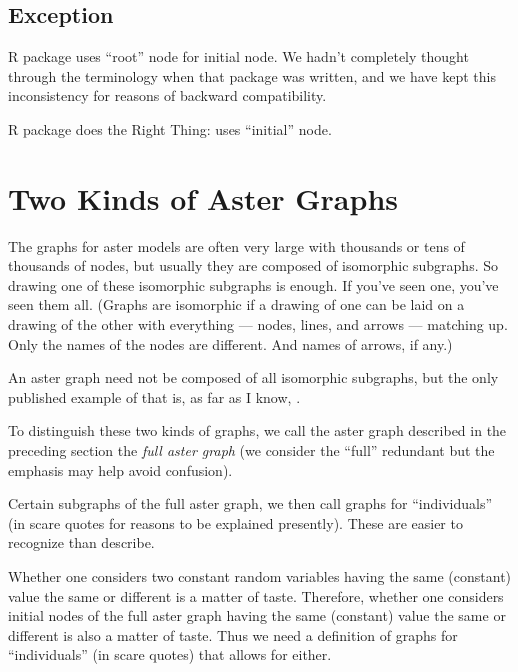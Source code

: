 \subsection{Exception}
\label{sec:exception-root}

R package  uses ``root'' node for initial node.
We hadn't completely thought through the terminology when that package
was written, and we have kept this inconsistency for reasons of backward
compatibility.

R package  does the Right Thing: uses ``initial'' node.

\section{Two Kinds of Aster Graphs}
\label{sec:scare-quotes}

The graphs for aster models are often very large with thousands or tens of
thousands of nodes, but usually they are composed of isomorphic subgraphs.
So drawing one of these isomorphic subgraphs is enough.
If you've seen one, you've seen them all.
(Graphs are isomorphic if a drawing of one can be laid on a drawing of the
other with everything --- nodes, lines, and arrows --- matching up.
Only the names of the nodes are different.  And names of arrows, if any.)

An aster graph need not be composed of all isomorphic subgraphs,
but the only published example of that is, as far as I know,
\citet{aster-hornworm}.

To distinguish these two kinds of graphs, we call the aster graph described
in the preceding section the \emph{full aster graph} (we consider the ``full''
redundant but the emphasis may help avoid confusion).

Certain subgraphs of the full aster graph, we then call graphs
for ``individuals'' (in scare quotes for reasons to be explained presently).
These are easier to recognize than describe.

Whether one considers two constant random variables having the same (constant)
value the same or different is a matter of taste.  Therefore, whether one
considers initial nodes of the full aster graph having the same (constant)
value the same or different is also a matter of taste.
Thus we need a definition of graphs for ``individuals'' (in scare quotes)
that allows for either.

